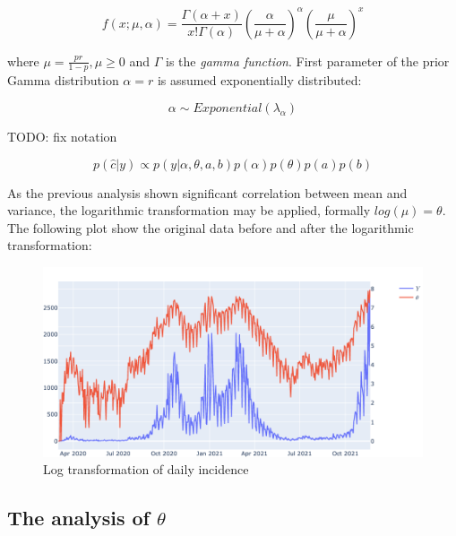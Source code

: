 \documentclass[
  digital, %
  oneside, %
  lof,     %
  lot,     %
]{fithesis4}
\begin{document}
\begin{equation}
f \left( x; \mu, \alpha \right) = \frac{\Gamma \left( \alpha + x \right) }{x! \Gamma \left( \alpha \right)} \left( \frac{\alpha}{\mu + \alpha} \right)^{\alpha} \left( \frac{\mu}{\mu + \alpha} \right)^{x}
\end{equation}

where $\mu = \frac{pr}{1-p}, \mu \geq 0$ and 
$\Gamma$ is the \textit{gamma function}. 
First parameter of the prior Gamma distribution 
$\alpha = r$ is assumed exponentially distributed:

\begin{equation}
	\alpha \sim Exponential \left( \lambda_{\alpha} \right)
\end{equation}

TODO: fix notation

\begin{equation}
p(\hat{c}|y) \propto p(y|\alpha, \theta, a, b) p(\alpha) p(\theta) p(a) p(b)
\end{equation}

As the previous analysis shown significant 
correlation between mean and variance, the 
logarithmic transformation may be applied, 
formally $log\left( \mu \right) = \theta$. 
The following plot show the original data 
before and after the logarithmic transformation:

\begin{figure}[h]
  \begin{center}
    \includegraphics[width=\textwidth]{images/incidence-log-transform.png}
  \end{center}
  \caption{Log transformation of daily incidence}
  \label{fig:incidence-log-transform}
\end{figure}


\subsection{The analysis of \texorpdfstring{$\theta$}{Lg}}
\end{document}
